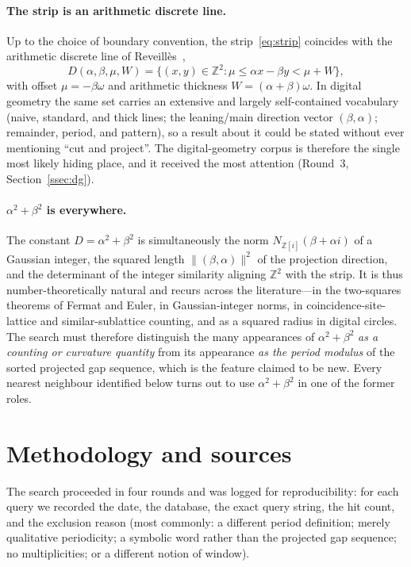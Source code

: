 \documentclass[11pt]{article}
\theoremstyle{plain}
\theoremstyle{remark}
\newcommand{\Z}{\mathbb{Z}}
\newcommand{\Zi}{\mathbb{Z}[i]}
\begin{document}
\paragraph{The strip is an arithmetic discrete line.}
Up to the choice of boundary convention, the strip~\eqref{eq:strip} coincides with
the arithmetic discrete line of Reveill\`es~\cite{Reveilles1991},
\[
  D(\alpha,\beta,\mu,W)=\{(x,y)\in\Z^2 : \mu \le \alpha x-\beta y < \mu+W\},
\]
with offset $\mu=-\beta\omega$ and arithmetic thickness $W=(\alpha+\beta)\omega$.
In digital geometry the same set carries an extensive and largely self-contained
vocabulary (naive, standard, and thick lines; the leaning/main direction vector
$(\beta,\alpha)$; remainder, period, and pattern), so a result about it could be
stated without ever mentioning ``cut and project''. The digital-geometry corpus is
therefore the single most likely hiding place, and it received the most attention
(Round~3, Section~\ref{ssec:dg}).

\paragraph{$\alpha^2+\beta^2$ is everywhere.}
The constant $D=\alpha^2+\beta^2$ is simultaneously the norm $N_{\Zi}(\beta+\alpha i)$
of a Gaussian integer, the squared length $\lVert(\beta,\alpha)\rVert^2$ of the
projection direction, and the determinant of the integer similarity aligning $\Z^2$
with the strip. It is thus number-theoretically natural and recurs across the
literature---in the two-squares theorems of Fermat and Euler, in Gaussian-integer
norms, in coincidence-site-lattice and similar-sublattice counting, and as a squared
radius in digital circles. The search must therefore distinguish the many
appearances of $\alpha^2+\beta^2$ \emph{as a counting or curvature quantity} from
its appearance \emph{as the period modulus} of the sorted projected gap sequence,
which is the feature claimed to be new. Every nearest neighbour identified below
turns out to use $\alpha^2+\beta^2$ in one of the former roles.

\section{Methodology and sources}\label{sec:method}

The search proceeded in four rounds and was logged for reproducibility: for each
query we recorded the date, the database, the exact query string, the hit count,
and the exclusion reason (most commonly: a different period definition; merely
qualitative periodicity; a symbolic word rather than the projected gap sequence;
no multiplicities; or a different notion of window).
\end{document}
